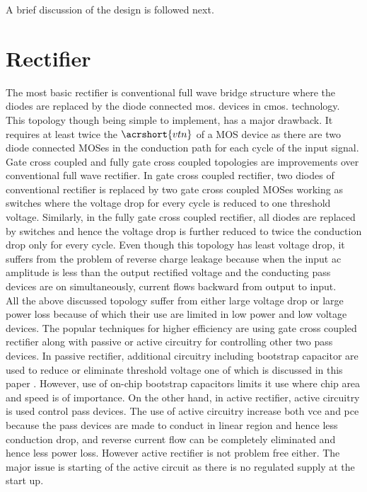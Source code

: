\documentclass[12pt,a4paper,UKenglish]{article}
\begin{document}
A brief discussion of the design is followed next.

\newpage

\section{Rectifier}
The most basic rectifier is conventional full wave bridge structure where the diodes are replaced by the diode connected \acrshort{mos}. devices in \acrshort{cmos}. technology. This topology though being simple to implement, has a major drawback. It requires at least twice the $\acrshort{vtn}$ of a MOS device as there are two diode connected MOSes in the conduction path for each cycle of the input signal.  \\

Gate cross coupled and fully gate cross coupled topologies are improvements over conventional full wave rectifier. In gate cross coupled rectifier, two diodes of conventional rectifier is replaced by two gate cross coupled MOSes working as switches where the voltage drop for every cycle is reduced to one threshold voltage. Similarly, in the fully gate cross coupled rectifier, all diodes are replaced by switches and hence the voltage drop is further reduced to twice the conduction drop only for every cycle. Even though this topology has least voltage drop, it suffers from the problem of reverse charge leakage because when the input ac amplitude is less than the output rectified voltage and the conducting pass devices are on simultaneously, current flows backward from output to input. \\

All the above discussed topology suffer from either large voltage drop or large power loss because of which their use are limited in low power and low voltage devices. The popular techniques for higher efficiency are using gate cross coupled rectifier along with passive or active circuitry  for controlling other two pass devices. In passive rectifier, additional circuitry including bootstrap capacitor are used to reduce or eliminate threshold voltage one of which is discussed in this paper \cite{rectboot}. However, use of on-chip bootstrap capacitors limits it use where chip area and speed is of importance. On the other hand, in active rectifier, active circuitry is used control pass devices. The use of active circuitry increase both  \acrshort{vce} and  \acrshort{pce} because the pass devices are made to conduct in linear region and hence less conduction drop, and reverse current flow can be completely eliminated and hence less power loss. However active rectifier is not problem free either. The major issue is starting of the active circuit as there is no regulated supply at the start up. \\
\end{document}
